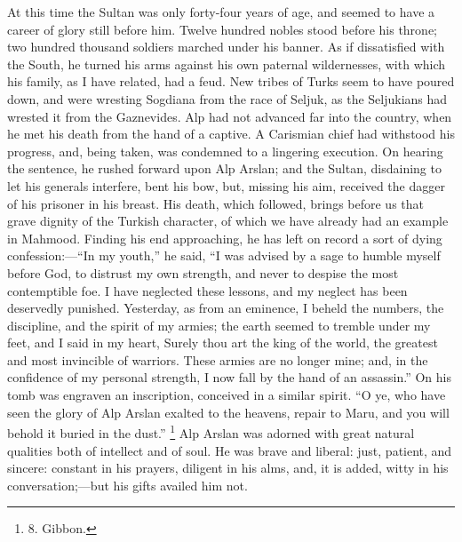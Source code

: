 At this time the Sultan was
only forty-four years of age, and seemed to have a career of glory
still before him. Twelve hundred nobles stood before his throne; two
hundred thousand soldiers marched under his banner. As if dissatisfied
with the South, he turned his arms against his own paternal
wildernesses, with which his family, as I have related, had a feud.
New tribes of Turks seem to have poured down, and were wresting
Sogdiana from the race of Seljuk, as the Seljukians had wrested it
from the Gaznevides. Alp had not advanced far into the country, when
he met his death from the hand of a captive. A Carismian chief had
withstood his progress, and, being taken, was condemned to a lingering
execution. On hearing the sentence, he rushed forward upon Alp Arslan;
and the Sultan, disdaining to let his generals interfere, bent his
bow, but, missing his aim, received the dagger of his prisoner in his
breast. His death, which followed, brings before us that grave dignity
of the Turkish character, of which we have already had an example in
Mahmood. Finding his end approaching, he has left on record a sort of
dying confession:—``In my youth,'' he said, ``I was advised by a sage
to humble myself before God, to distrust my own strength, and never to
despise the most contemptible foe. I have neglected these lessons, and
my neglect has been deservedly punished. Yesterday, as from an
eminence, I beheld the numbers, the discipline, and the spirit of my
armies; the earth seemed to tremble under my feet, and I said in my
heart, Surely thou art the king of the world, the greatest and most
invincible of warriors. These armies are no longer mine; and, in the
confidence of my personal strength, I now fall by the hand of an
assassin.'' On his tomb was engraven an inscription, conceived in a
similar spirit. ``O ye, who have seen the glory of Alp Arslan
exalted to the heavens, repair to Maru, and you will behold it buried
in the dust.'' \footnote{8.
Gibbon.} Alp Arslan
was adorned with great natural qualities both of intellect and of
soul. He was brave and liberal: just, patient, and sincere: constant
in his prayers, diligent in his alms, and, it is added, witty in his
conversation;—but his gifts availed him not.

